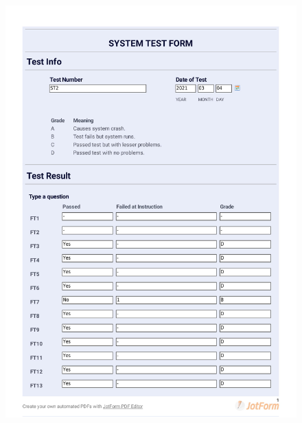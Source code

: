 \documentclass{article}
\begin{document}
\begin{figure}
     \centering
     \includegraphics[width=13cm]{images/2021-03-04_Malte_ST2-1}
     \renewcommand\figurename{Figure}
     \label{fig:my_label}
 \end{figure}
 
\end{document}
